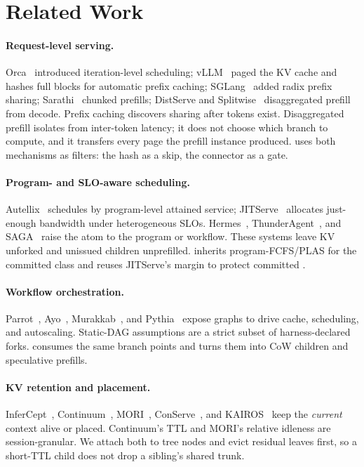 \section{Related Work}
\label{sec:related}

\paragraph{Request-level serving.}
Orca~\cite{orca} introduced iteration-level scheduling; vLLM~\cite{vllm} paged the KV cache and hashes full blocks for automatic prefix caching; SGLang~\cite{sglang} added radix prefix sharing; Sarathi~\cite{sarathi,sarathisplit} chunked prefills; DistServe and Splitwise~\cite{distserve,splitwise} disaggregated prefill from decode.
Prefix caching discovers sharing after tokens exist.
Disaggregated prefill isolates \ttft{} from inter-token latency; it does not choose which branch to compute, and it transfers every page the prefill instance produced.
\app uses both mechanisms as filters: the hash as a skip, the connector as a gate.

\paragraph{Program- and SLO-aware scheduling.}
Autellix~\cite{autellix} schedules by program-level attained service; JITServe~\cite{jitserve} allocates just-enough bandwidth under heterogeneous SLOs.
Hermes~\cite{hermes}, ThunderAgent~\cite{thunderagent}, and SAGA~\cite{saga} raise the atom to the program or workflow.
These systems leave KV unforked and unissued children unprefilled.
\sys{} inherits program-FCFS/PLAS for the committed class and reuses JITServe's margin to protect committed \tbt.

\paragraph{Workflow orchestration.}
Parrot~\cite{parrot}, Ayo~\cite{ayo}, Murakkab~\cite{murakkab}, and Pythia~\cite{pythia} expose graphs to drive cache, scheduling, and autoscaling.
Static-DAG assumptions are a strict subset of harness-declared forks.
\sys{} consumes the same branch points and turns them into CoW children and speculative prefills.

\paragraph{KV retention and placement.}
InferCept~\cite{infercept}, Continuum~\cite{continuum}, MORI~\cite{mori}, ConServe~\cite{conserve}, and KAIROS~\cite{kairospower} keep the \emph{current} context alive or placed.
Continuum's TTL and MORI's relative idleness are session-granular.
We attach both to tree nodes and evict residual leaves first, so a short-TTL child does not drop a sibling's shared trunk.

